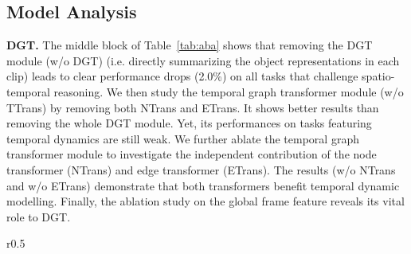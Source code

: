 \documentclass[runningheads]{llncs}
\begin{document}
\subsection{Model Analysis}
\label{sec:analysis}

\textbf{DGT.} 
The middle block of Table~\ref{tab:aba} shows that removing the DGT module (w/o DGT) (i.e. directly summarizing the object representations in each clip) leads to clear performance drops (2.0\%) on all tasks that 
challenge spatio-temporal reasoning. We then study the temporal graph transformer module (w/o TTrans) by removing both NTrans and ETrans. It shows better results than removing the whole DGT module. Yet, its performances on tasks featuring temporal dynamics are still weak. We further ablate the temporal graph transformer module to investigate the independent contribution of the node transformer (NTrans) and edge transformer (ETrans). The results (w/o NTrans and w/o ETrans) demonstrate that both transformers
benefit temporal dynamic modelling. Finally, the ablation study on the global frame feature  reveals its vital role to DGT.

\setlength{\tabcolsep}{1pt}
\begin{wraptable}[8]{r}{0.5\textwidth}
\vspace{-10pt}
    \small
    \centering
    \caption{Study of model components}
    \label{tab:aba}
    \vspace{4pt}
    \vspace{-0.3cm}
\end{wraptable}
\end{document}
